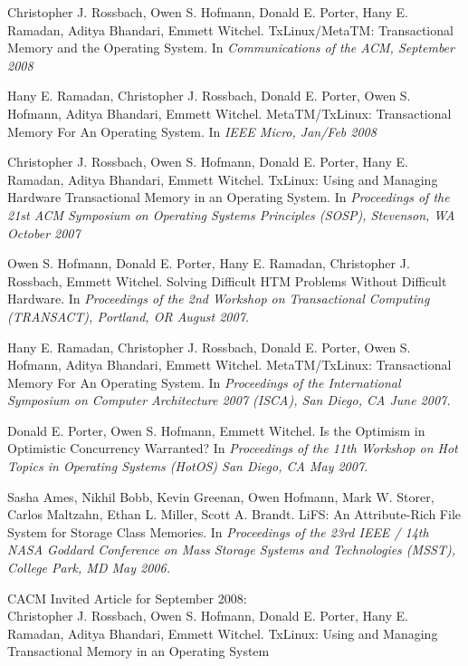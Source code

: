 \documentclass[10pt]{article}
\makeatletter
\newlength{\bibhang}
\newlength{\bibsep}
 {\@listi \global\bibsep\itemsep \global\advance\bibsep by\parsep}
\newenvironment{bibsection}
    {\list{}{%
        \setlength{\leftmargin}{\bibhang}%
        \setlength{\itemindent}{-\leftmargin}%
        \setlength{\itemsep}{\bibsep}%
        \setlength{\parsep}{\z@}%
        }}
    {\endlist}
\renewcommand{\section}[2]%
        {\pagebreak[2]\vspace{1.3\baselineskip}%
         \phantomsection\addcontentsline{toc}{section}{#1}%
         \hspace{0in}%
         \marginpar{
         \raggedright \scshape #1}#2}
\makeatother
\begin{document}
\begin{bibsection}
\item Christopher J. Rossbach, Owen S. Hofmann, Donald E. Porter, Hany E.
Ramadan, Aditya Bhandari, Emmett Witchel.
TxLinux/MetaTM: Transactional Memory and the Operating System.
In \emph{Communications of the ACM, September 2008} 
 
\item Hany E. Ramadan, Christopher J. Rossbach, Donald E. Porter, Owen S.
Hofmann, Aditya Bhandari, Emmett Witchel.
MetaTM/TxLinux: Transactional Memory For An Operating System.
 In \emph{IEEE Micro, Jan/Feb 2008}
 
\item Christopher J. Rossbach, Owen S. Hofmann, Donald E. Porter, Hany E.
Ramadan, Aditya Bhandari, Emmett Witchel.
TxLinux: Using and Managing Hardware Transactional Memory in an
Operating System.
In \emph{Proceedings of the 21st ACM Symposium on Operating Systems
Principles (SOSP), Stevenson, WA October 2007} 
 
\item Owen S. Hofmann, Donald E. Porter, Hany E. Ramadan, Christopher J.
Rossbach, Emmett Witchel.
Solving Difficult HTM Problems Without Difficult Hardware.
In \emph{Proceedings of the 2nd Workshop on Transactional Computing
(TRANSACT), Portland, OR August 2007.} 
 
\item Hany E. Ramadan, Christopher J. Rossbach, Donald E. Porter, Owen S.
Hofmann, Aditya Bhandari, Emmett Witchel.
MetaTM/TxLinux: Transactional Memory For An Operating System.
In \emph{Proceedings of the International Symposium on Computer
Architecture 2007 (ISCA), San Diego, CA June 2007.} 
 
\item Donald E. Porter, Owen S. Hofmann, Emmett Witchel.
Is the Optimism in Optimistic Concurrency Warranted? 
In \emph{Proceedings of the 11th Workshop on Hot Topics in Operating
Systems (HotOS) San Diego, CA May 2007.} 
 
\item Sasha Ames, Nikhil Bobb, Kevin Greenan, Owen Hofmann, Mark W. Storer,
Carlos Maltzahn, Ethan L. Miller, Scott A. Brandt.
LiFS: An Attribute-Rich File System for Storage Class Memories.
In \emph{Proceedings of the 23rd IEEE / 14th NASA Goddard Conference on
Mass Storage Systems and Technologies (MSST), College Park, MD May
2006.} 
\end{bibsection}



\section{Awards}
%
CACM Invited Article for September 2008: \\
Christopher J. Rossbach,
Owen S. Hofmann, Donald E. Porter, Hany E. Ramadan, Aditya Bhandari,
Emmett Witchel. TxLinux: Using and Managing Transactional Memory in
an Operating System
\end{document}
